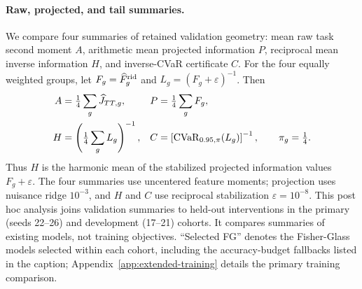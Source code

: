 \paragraph{Raw, projected, and tail summaries.}
We compare four summaries of retained validation geometry: mean raw task second moment $A$, arithmetic mean projected information $P$, reciprocal mean inverse information $H$, and inverse-CVaR certificate $C$. For the four equally weighted groups, let $F_g=\widehat F_g^{\mathrm{rid}}$ and $L_g=(F_g+\varepsilon)^{-1}$. Then
\[
\begin{aligned}
A&=\tfrac14\sum_g\widehat J_{TT,g}, &
P&=\tfrac14\sum_g F_g,\\
H&=\left(\tfrac14\sum_g L_g\right)^{-1}, &
C&=\left[\operatorname{CVaR}_{0.95,\pi}(L_g)\right]^{-1},\qquad \pi_g=\tfrac14.
\end{aligned}
\]
Thus $H$ is the harmonic mean of the stabilized projected information values $F_g+\varepsilon$. The four summaries use uncentered feature moments; projection uses nuisance ridge $10^{-3}$, and $H$ and $C$ use reciprocal stabilization $\varepsilon=10^{-8}$. This post hoc analysis joins validation summaries to held-out interventions in the primary (seeds 22--26) and development (17--21) cohorts. It compares summaries of existing models, not training objectives. ``Selected FG'' denotes the Fisher-Glass models selected within each cohort, including the accuracy-budget fallbacks listed in the caption; Appendix~\ref{app:extended-training} details the primary training comparison.

